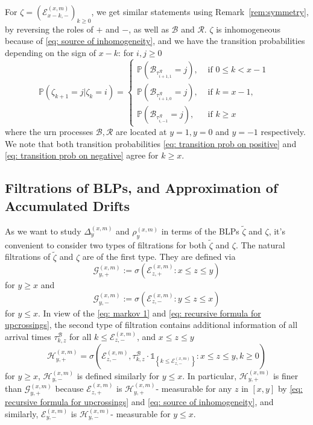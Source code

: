 \documentclass[twoside,12pt, a4paper, final]{article}
\numberwithin{equation}{section}
\theoremstyle{remark}
\begin{document}
	For $\zeta= \left(\mathcal{E}^{(x,m)}_{x-k,-} \right)_{k\geq 0}$, we get similar statements using Remark~\ref{rem:symmetry}, by reversing the roles of $+$ and $-$, as well as $\mathcal{B}$ and $\mathcal{R}$. $\zeta$ is inhomogeneous because of \eqref{eq: source of inhomogeneity}, and we have the transition probabilities depending on the sign of $x-k$: for $i,j\geq 0$
	\begin{equation}\label{eq: transition prob on negative}
		\mathbb{P}\left(\zeta_{k+1}=j \vert \zeta_k =i  \right) = 
		\begin{cases}
			\mathbb{P}\left( \mathcal{B}_{\tau_{i+1,1}^{\mathcal{R}}} = j \right) ,& \mbox{ if $0 \leq k <  x-1$ }
			\\
			\mathbb{P}\left( \mathcal{B}_{\tau_{i+1,0}^{\mathcal{R}}} = j \right) ,& \mbox{ if $k =  x-1$, }
			\\
			\mathbb{P}\left( \mathcal{B}_{\tau_{i,-1}^{\mathcal{R}}} = j \right) ,& \mbox{ if $k \geq x$ }
		\end{cases}
	\end{equation}
	where the urn processes $\mathcal{B}, \mathcal{R}$ are located at $y = 1, y=0$ and $y = -1$ respectively. We note that both transition probabilities \eqref{eq: transition prob on positive} and \eqref{eq: transition prob on negative} agree for $k \ge x$.
	
	
	\subsection{Filtrations of BLPs, and Approximation of Accumulated Drifts}\label{subsec: measurability}
	
	As we want to study $\Delta^{(x,m)}_{y}$ and $\rho^{(x,m)}_{y}$ in terms of the BLPs $\tilde{\zeta}$ and $\zeta$, it's convenient to consider two types of filtrations for both $\tilde{\zeta}$ and $\zeta$. The natural filtrations of $\tilde{\zeta}$ and $\zeta$ are of the first type. They are defined via 
	$$\mathcal{G}_{y, +}^{(x,m)}:=\sigma\left(\mathcal{E}^{(x,m)}_{z, +}: x \le z \le y\right) $$ for $y \ge x$ and $$\mathcal{G}_{y, -}^{(x,m)}:=\sigma\left(\mathcal{E}^{(x,m)}_{z, -}: y \le z \le x\right) $$ for $y \le x$.
	In view of the \eqref{eq: markov 1} and \eqref{eq: recursive formula for upcrossings},
	the second type of filtration contains additional information of all arrival times $\tau^\mathcal{B}_{k,z}$ for all $k\leq \mathcal{E}^{(x,m)}_{z, -}$, and $x\leq z \leq y$
	\[
	\mathcal{H}_{y, +}^{(x,m)} = \sigma\left( \mathcal{E}_{z, -}^{(x,m)}, \tau_{k, z}^\mathcal{B}\cdot \mathbb{1}_{\left\{ k\leq \mathcal{E}_{z, -}^{(x,m)} \right\}} : x \leq  z \leq y,  k \geq 0 \right) 
	\]
	for $y\geq x$, $\mathcal{H}_{y, -}^{(x,m)}$ is defined similarly for $y\leq x$.
	In particular, $\mathcal{H}_{y, +}^{(x,m)}$ is finer than $\mathcal{G}_{y, +}^{(x,m)}$ because $\mathcal{E}_{z, +}^{(x,m)}$ is $\mathcal{H}_{y, +}^{(x,m)}$- measurable for any $z$ in $[x,y]$ by \eqref{eq: recursive formula for upcrossings} and \eqref{eq: source of inhomogeneity}, and similarly, $\mathcal{E}_{y, -}^{(x,m)}$ is $\mathcal{H}_{y, -}^{(x,m)}$- measurable for $ y\leq x$. 
	
\end{document}
